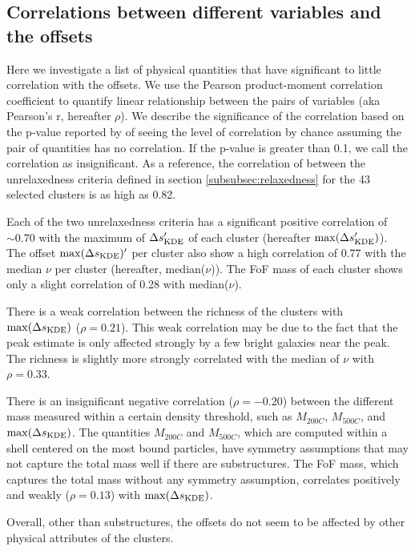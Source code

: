 \subsection{Correlations between different variables and the offsets}

Here we investigate a list of physical quantities that have significant to little
correlation with the offsets. 
We use the Pearson product-moment correlation coefficient to quantify linear 
relationship between the pairs of variables
(aka Pearson's r,  hereafter $\rho$).
We describe the significance of the correlation 
based on the p-value reported by {} of seeing the level of 
correlation by chance assuming the pair of 
quantities has no correlation. If the p-value is greater than 0.1, we call the
correlation as insignificant.
As a reference, the correlation of between the 
unrelaxedness criteria defined in section \ref{subsubsec:relaxedness}
for the 43 selected clusters is as high as 0.82. 

Each of the two unrelaxedness criteria has a significant positive correlation of $\sim 0.70$
with the maximum of $\Delta s_{\rm KDE}'$ of each cluster
(hereafter $\max(\Delta s_{\rm KDE}')$).
The offset $\max(\Delta s_{\rm KDE})'$ per cluster also show a high
correlation of 0.77 with the median $\nu$ per cluster (hereafter,
median($\nu$)). The FoF mass of each cluster shows only a slight correlation of 0.28 with 
 median($\nu$).

There is a weak correlation between the richness of the
clusters with $\max(\Delta s_{\rm KDE})$ ($\rho = 0.21$). This weak correlation 
may be due to 
the fact that the peak estimate is only affected strongly by a few bright galaxies near 
the peak. The richness is slightly more strongly correlated with the median of $\nu$ 
with $\rho = 0.33$. 

There is an insignificant negative correlation ($\rho = -0.20$) between the different mass 
measured within a certain density threshold, such as $M_{200C}$, $M_{500C}$, 
and $\max(\Delta s_{\rm KDE})$. The quantities $M_{200C}$ and $M_{500C}$, which
are computed within a shell centered on the most bound particles, have
symmetry assumptions that may not capture the total mass well if there are substructures. 
The FoF mass, which
captures the total mass without any symmetry assumption, correlates positively
and weakly 
($\rho = 0.13$) with $\max(\Delta s_{\rm KDE})$. 

Overall, other than substructures, the offsets do not seem to be affected by
other physical attributes of the clusters.

